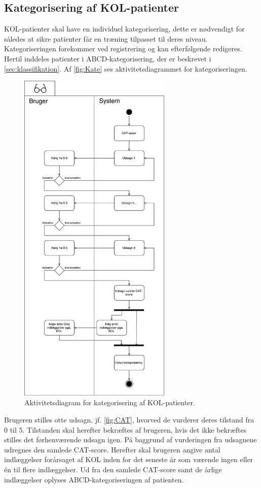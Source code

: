 \subsection*{Kategorisering af KOL-patienter} \label{sec:kategorisering}
KOL-patienter skal have en individuel kategorisering, dette er nødvendigt for således at sikre patienter får en træning tilpasset til deres niveau. Kategoriseringen forekommer ved registrering og kan efterfølgende redigeres.
Hertil inddeles patienter i ABCD-kategorisering, der er beskrevet i \autoref{sec:klassifikation}. Af \autoref{fig:Kate} ses aktivitetsdiagrammet for kategoriseringen.

\begin{figure} [H]
\centering
\includegraphics[width=0.65\textwidth]{figures/aktivitetsdiagram/Kategorisering}
\caption{Aktivitetsdiagram for kategorisering af KOL-patienter.}
\label{fig:Kate}
\end{figure}

\noindent
Brugeren stilles otte udsagn, jf. \autoref{fig:CAT}, hvorved de vurderer deres tilstand fra 0 til 5. Tilstanden skal herefter bekræftes af brugeren, hvis det ikke bekræftes stilles det førhenværende udsagn igen. På baggrund af vurderingen fra udsagnene udregnes den samlede CAT-score. Herefter skal brugeren angive antal indlæggelser forårsaget af KOL inden for det seneste år som værende ingen eller én til flere indlæggelser. Ud fra den samlede CAT-score samt de årlige indlæggelser oplyses ABCD-kategoriseringen af patienten. 